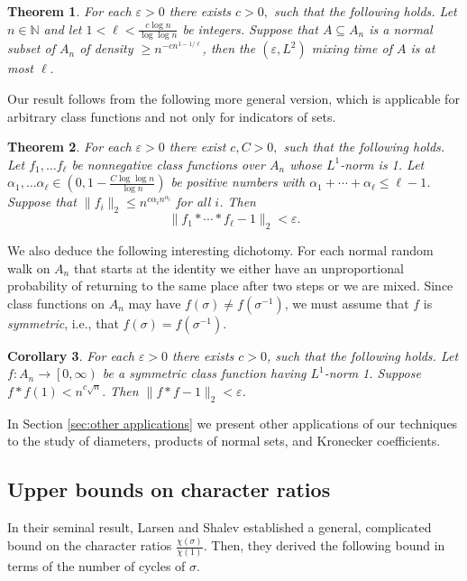 \documentclass[11pt, letterpaper]{amsart}
\newtheorem{thm}{Theorem}[section]
\newtheorem{cor}[thm]{Corollary}
\newcommand{\remove}[1]{}
\newcommand\eps{\varepsilon}
\renewcommand\ge{\geqslant}
\renewcommand\le{\leqslant}
\renewcommand{\epsilon}{\eps}
\newcommand{\NN}{\mathbb{N}}
\begin{document}
\begin{thm}\label{thm:Simplified mixing time}
For each $\epsilon>0$ there exists $c>0,$ such that the following holds. Let $n\in \NN$ and let $1 < \ell<\frac{c\log n}{\log\log n}$ be integers.
Suppose that $A \subseteq A_n$ is a normal subset of $A_n$ of density $\ge n^{-cn^{1- 1/\ell}}$, then the $(\epsilon, L^2)$ mixing time of $A$ is at most $\ell.$  
\end{thm}

Our result follows from the following more general version, which is applicable for arbitrary class functions and not only for indicators of sets.
\begin{thm}\label{thm:mixing time results}
For each $\epsilon>0$ there exist $c,C>0,$ such that the following holds. Let $f_1,\ldots f_\ell$ be nonnegative class functions over $A_n$ whose $L^1$-norm is 1. Let $\alpha_1, \ldots \alpha_\ell \in \left(0, 1-\frac{C\log \log n}{\log n}\right)$ be positive numbers with $\alpha_1 + \cdots + \alpha_\ell \le \ell-1$.
Suppose that $\|f_i\|_2 \le n^{c\alpha_in^{\alpha_i}}$ for all $i$. Then 
\[
\|f_1*\cdots * f_\ell - 1 \|_2 < \epsilon.
\]
\end{thm}

We also deduce the following interesting dichotomy. For each normal random walk on $A_n$ that starts at the identity we either have an unproportional probability of returning to the same place after two steps or we are mixed. Since class functions on $A_n$ may have $f(\sigma) \ne f(\sigma^{-1})$, we must assume that $f$ is \emph{symmetric}, i.e., that $f(\sigma) = f(\sigma^{-1}).$

\begin{cor}\label{cor:two steps mixing}
    For each $\epsilon>0$ there exists $c>0$, such that the following holds. Let $f\colon A_n \to \left[0,\infty\right)$ be a symmetric class function having $L^1$-norm 1. Suppose 
    $f*f(1)<n^{c\sqrt{n}}.$
    Then $\|f*f-1\|_2<\epsilon$.
\end{cor}

In Section \ref{sec:other applications} we present other applications of our techniques to the study of diameters, products of normal sets, and Kronecker coefficients.

\remove{
}

\subsection{Upper bounds on character ratios}
\label{subsec:intro character ratios}
In their seminal result, Larsen and Shalev \cite{larsen2008characters} established a general, complicated bound on the character ratios $\frac{\chi(\sigma)}{\chi(1)}$. Then, they derived the following bound in terms of the number of cycles of $\sigma$. 
\end{document}
